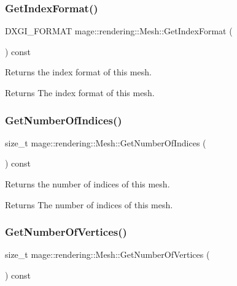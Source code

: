 \subsubsection{\texorpdfstring{Get\+Index\+Format()}{GetIndexFormat()}}
{\footnotesize\ttfamily D\+X\+G\+I\+\_\+\+F\+O\+R\+M\+AT mage\+::rendering\+::\+Mesh\+::\+Get\+Index\+Format (\begin{DoxyParamCaption}{ }\end{DoxyParamCaption}) const\hspace{0.3cm}{\ttfamily [noexcept]}}

Returns the index format of this mesh.

\begin{DoxyReturn}{Returns}
The index format of this mesh. 
\end{DoxyReturn}
\hypertarget{classmage_1_1rendering_1_1_mesh_aaf8574345279790ca88d8acc5c2c85b6}{}\label{classmage_1_1rendering_1_1_mesh_aaf8574345279790ca88d8acc5c2c85b6} 
\subsubsection{\texorpdfstring{Get\+Number\+Of\+Indices()}{GetNumberOfIndices()}}
{\footnotesize\ttfamily size\+\_\+t mage\+::rendering\+::\+Mesh\+::\+Get\+Number\+Of\+Indices (\begin{DoxyParamCaption}{ }\end{DoxyParamCaption}) const\hspace{0.3cm}{\ttfamily [noexcept]}}

Returns the number of indices of this mesh.

\begin{DoxyReturn}{Returns}
The number of indices of this mesh. 
\end{DoxyReturn}
\hypertarget{classmage_1_1rendering_1_1_mesh_a2c594e3c3b8e09bc20b35845ab46b6f3}{}\label{classmage_1_1rendering_1_1_mesh_a2c594e3c3b8e09bc20b35845ab46b6f3} 
\subsubsection{\texorpdfstring{Get\+Number\+Of\+Vertices()}{GetNumberOfVertices()}}
{\footnotesize\ttfamily size\+\_\+t mage\+::rendering\+::\+Mesh\+::\+Get\+Number\+Of\+Vertices (\begin{DoxyParamCaption}{ }\end{DoxyParamCaption}) const\hspace{0.3cm}{\ttfamily [noexcept]}}

